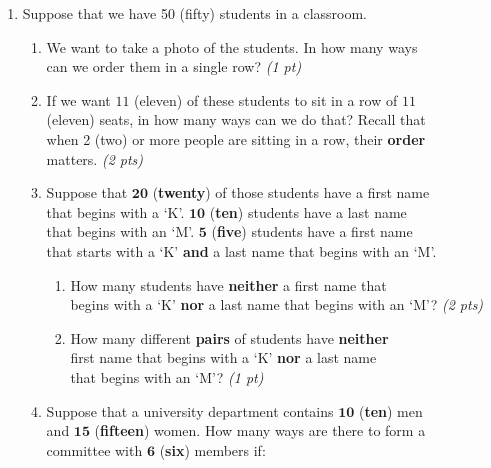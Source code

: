 \documentclass[letterpaper,10pt]{article}
\begin{document}
{{\begin{enumerate}[label=(\alph*)]
\begin{enumerate}[label=(\roman*)]
		\item An \textbf{equal number} of 1s and 0s? \null\hfill \myline{1in} {\em (2 pts)}
	\end{enumerate} \singlespacing
	\item  Suppose that we have 50 (fifty) students in a classroom. 
	\begin{enumerate}[label=(\roman*)] 
		\item  \doublespacing \setlength\itemsep{1.5em}  We want to take a photo of the students. In how many ways  \\ can we order them in a single row? \null\hfill \myline{1in} {\em(1 pt)} 
		\item  If we want $11$ (eleven) of these students to  sit in a row of $11$ \\  (eleven) seats, in how many ways can we do that? Recall that \\  when 2 (two) or more people are sitting in a row, their {\bf order} \\ 
matters.  \null\hfill \myline{1in}  {\em (2 pts)}
		\item  Suppose that $\mathbf{20}$ (\textbf{twenty}) of those students have a first name \\  that begins with a `K'. $\mathbf{10}$ (\textbf{ten}) students have a last name \\ that begins with an `M'.  $\mathbf 5$ (\textbf{five}) students have a first name \\ that starts with a `K' {\bf and} a last name that begins with an `M'. 
		\vspace{1em}
		\begin{enumerate}[label=(\roman*)]
			\item How many students have  {\bf neither} a first name  that \\ begins with a `K' {\bf nor} a last name that begins with  an `M'? \null\hfill \myline{1in} {\em (2 pts)} 
			\item How many different {\bf pairs} of students have {\bf neither} \\  first name  that  begins with a `K' {\bf nor} a last name \\ that begins with an `M'? \null\hfill \myline{1in} {\em (1 pt)} 
	\end{enumerate}	
		\item Suppose that a university department contains $\mathbf{10}$ (\textbf{ten}) men \\ and $\mathbf{15}$ (\textbf{fifteen}) women. How many ways are there to form a  \\ committee with $\mathbf{6}$ (\textbf{six}) members if: \vspace{1em}

\end{enumerate}
\end{enumerate}}}
\end{document}
